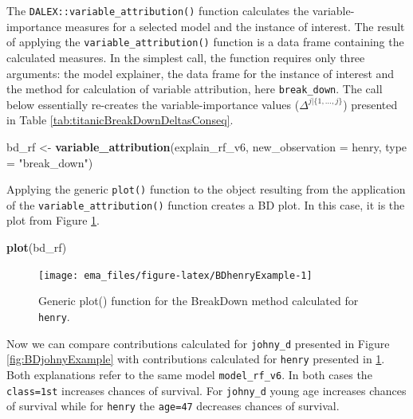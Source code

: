 \documentclass[]{krantz}
\newenvironment{Shaded}{\begin{snugshade}}{\end{snugshade}}
\newcommand{\DataTypeTok}[1]{\textcolor[rgb]{0.13,0.29,0.53}{#1}}
\newcommand{\KeywordTok}[1]{\textcolor[rgb]{0.13,0.29,0.53}{\textbf{#1}}}
\newcommand{\NormalTok}[1]{#1}
\newcommand{\StringTok}[1]{\textcolor[rgb]{0.31,0.60,0.02}{#1}}
\begin{document}
The \texttt{DALEX::variable\_attribution()} function calculates the variable-importance measures for a selected model and the instance of interest.
The result of applying the \texttt{variable\_attribution()} function is a data frame containing the calculated measures. In the simplest call, the function requires only three arguments: the model explainer, the data frame for the instance of interest and the method for calculation of variable attribution, here \texttt{break\_down}. The call below essentially re-creates the variable-importance values (\(\Delta^{j|\{1,\ldots,j\}}\)) presented in Table \ref{tab:titanicBreakDownDeltasConseq}.

\begin{Shaded}
\begin{Highlighting}[]
\NormalTok{bd_rf <-}\StringTok{ }\KeywordTok{variable_attribution}\NormalTok{(explain_rf_v6,}
                 \DataTypeTok{new_observation =}\NormalTok{ henry,}
                 \DataTypeTok{type =} \StringTok{"break_down"}\NormalTok{)}
\end{Highlighting}
\end{Shaded}

Applying the generic \texttt{plot()} function to the object resulting from the application of the \texttt{variable\_attribution()} function creates a BD plot. In this case, it is the plot from Figure \ref{fig:BDhenryExample}.



\begin{Shaded}
\begin{Highlighting}[]
\KeywordTok{plot}\NormalTok{(bd_rf) }
\end{Highlighting}
\end{Shaded}

\begin{figure}

{\centering \texttt{[image: ema\_files/figure-latex/BDhenryExample-1]} 

}

\caption{Generic plot() function for the BreakDown method calculated for \texttt{henry}.}\label{fig:BDhenryExample}
\end{figure}

Now we can compare contributions calculated for \texttt{johny\_d} presented in Figure \ref{fig:BDjohnyExample} with contributions calculated for \texttt{henry} presented in \ref{fig:BDhenryExample}.
Both explanations refer to the same model \texttt{model\_rf\_v6}. In both cases the \texttt{class=1st} increases chances of survival. For \texttt{johny\_d} young age increases chances of survival while for \texttt{henry} the \texttt{age=47} decreases chances of survival.
\end{document}

